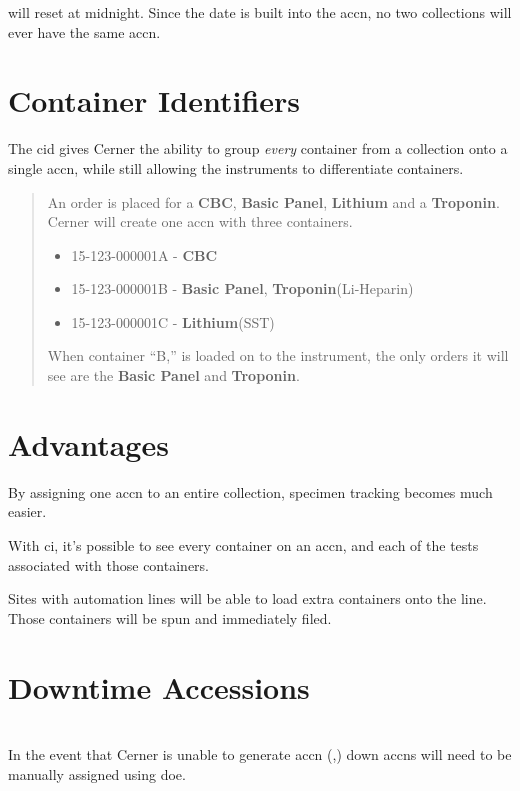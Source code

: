  will reset at midnight. Since the date is built into the \gls{accn}, no two collections will ever have the same \gls{accn}.

\clearpage
\section{Container Identifiers}\label{sec:accn_cid}

The \gls{cid} gives Cerner the ability to group \textit{every} container from a collection onto a single \gls{accn}, while still allowing the instruments to differentiate containers.


\begin{quote}
An order is placed for a \textbf{CBC}, \textbf{Basic Panel}, \textbf{Lithium} and a \textbf{Troponin}.
Cerner will create one \gls{accn} with three containers.
    \begin{itemize}
        \item 15-123-000001A - \textbf{CBC}
        \item 15-123-000001B - \textbf{Basic Panel}, \textbf{Troponin}(Li-Heparin)
        \item 15-123-000001C - \textbf{Lithium}(SST)
    \end{itemize}
When container ``B,'' is loaded on to the instrument, the only orders it will see are the \textbf{Basic Panel} and \textbf{Troponin}.
\end{quote}


\section{Advantages}

By assigning one \gls{accn} to an entire collection, specimen tracking becomes much easier.

With \Gls{ci}, it's possible to see every container on an \gls{accn}, and each of the tests associated with those containers.

Sites with automation lines will be able to load extra containers onto the line. Those containers will be spun and immediately filed.

\section{Downtime Accessions}
\\
In the event that Cerner is unable to generate \gls{accn} (,) \gls{down} \glspl{accn} will need to be manually assigned using \gls{doe}.

